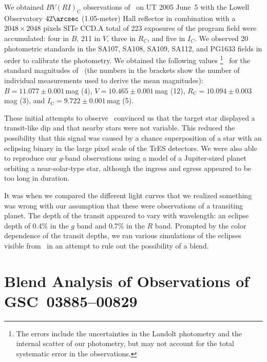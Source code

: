 We obtained $BV(RI)_{\mathrm C}$ observations of \gscOTE\ on UT 2005 June~5%
with the Lowell Observatory $42\arcsec$ (1.05-meter) Hall reflector in
combination with a $2048 \times 2048 $ pixels SITe CCD.\@ A total of 223
exposures of the program field were accumulated: four in $B$, 211 in
$V$, three in $R_C$, and five in $I_C$. We observed 20 photometric
standards in the SA107, SA108, SA109, SA112, and PG1633 fields
\citep{Landolt:aj:1992a} in order to calibrate the photometry. We
obtained the following values%
\footnote{The errors include the uncertainties in the Landolt
  photometry and the internal scatter of our photometry, but may not
  account for the total systematic error in the observations.}%
\ for the standard magnitudes of \gscOTE\ (the numbers in the brackets
show the number of individual measurements used to derive the mean
magnitudes): $B = 11.077 \pm 0.001$\,mag (4), $V = 10.465 \pm 0.001$\,mag (12), $R_{\mathrm C} = 10.094 \pm 0.003$\,mag (3), and $I_{\mathrm C} = 9.722 \pm 0.001$\,mag (5).

These initial attempts to observe \gscOTE\ convinced us that the target
star displayed a transit-like dip and that nearby stars were not
variable. This reduced the possibility that this signal was caused by
a chance superposition of a star with an eclipsing binary in the large
pixel scale of the TrES detectors. We were also able to reproduce our
$g$-band observations using a model of a Jupiter-sized planet
orbiting a near-solar-type star, although the ingress and egress
appeared to be too long in duration.

It was when we compared the different light curves that we realized
something was wrong with our assumption that these were observations
of a transiting planet. The depth of the transit appeared to vary with
wavelength: an eclipse depth of 0.4\% in the $g$ band and 0.7\% in the
$R$ band. Prompted by the color dependence of the transit depths, we
ran various simulations of the eclipses visible from \gscOTE\ in an
attempt to rule out the possibility of a blend.

\section{Blend Analysis of Observations of \\ \mbox{GSC 03885--00829}}\label{cha:gsc:sec:blend}

